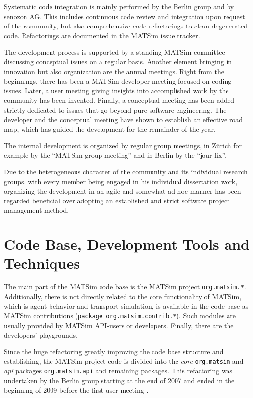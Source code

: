 Systematic code integration is mainly performed by the Berlin group and by senozon AG. This includes continuous code review and integration upon request of the community, but also comprehensive code refactorings to clean degenerated code. Refactorings are documented in the MATSim issue tracker.

The development process is supported by a standing MATSim committee discussing conceptual issues on a regular basis. Another element bringing in innovation but also organization are the annual meetings. Right from the beginnings, there has been a MATSim developer meeting focused on coding issues. Later, a user meeting giving insights into accomplished work by the community has been invented. Finally, a conceptual meeting has been added strictly dedicated to issues that go beyond pure software engineering. The developer and the conceptual meeting have shown to establish an effective road map, which has guided the development for the remainder of the year. 

The internal development is organized by regular group meetings, in Zürich for example by the ``MATSim group meeting'' and in Berlin by the ``jour fix''. 

Due to the heterogeneous character of the community and its individual research groups, with every member being engaged in his individual dissertation work, organizing the development in an agile and somewhat ad hoc manner has been regarded beneficial over adopting an established and strict software project management method.

\section{Code Base, Development Tools and Techniques}
The main part of the MATSim code base is the MATSim project \lstinline|org.matsim.*|. Additionally, there is not directly related to the core functionality of MATSim, which is agent-behavior and transport simulation, is available in the code base as MATSim contributions (\lstinline|package org.matsim.contrib.*|). Such modules are usually provided by MATSim API-users or developers. Finally, there are the developers' playgrounds.

Since the huge refactoring greatly improving the code base structure and establishing, the MATSim project code is divided into the \emph{core} \lstinline|org.matsim| and \emph{api} packages \lstinline|org.matsim.api| and remaining packages. This refactoring was undertaken by the Berlin group starting at the end of 2007 and ended in the beginning of 2009 before the first user meeting .

